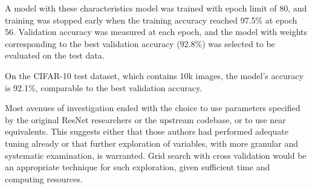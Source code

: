 \documentclass[letterpaper]{article} %
\begin{document}
A model with these characteristics model was trained with epoch limit of 80, and
training was stopped early when the training accuracy reached 97.5\% at epoch 56.
Validation accuracy was measured at each epoch, and the model with weights corresponding to the best
validation accuracy (92.8\%) was selected to be evaluated on the test data.

On the CIFAR-10 test dataset, which contains 10k images, the model's accuracy is 92.1\%,
comparable to the best validation accuracy.

Most avenues of investigation ended with the choice to use parameters specified by the original ResNet researchers or
the upstream codebase, or to use near equivalents.
This suggests either that those authors had performed adequate tuning already or that further exploration of variables,
with more granular and systematic examination, is warranted.
Grid search with cross validation would be an appropriate technique for such exploration, given sufficient time and
computing resources.


\end{document}
